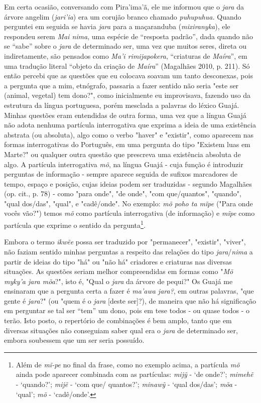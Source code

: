Em certa ocasião, conversando com Pira'ima'ã, ele me informou que o
\emph{jara} da árvore angelim (\emph{jari'ia}) era um corujão branco
chamado \emph{puhupuhua.} Quando perguntei em seguida se havia
\emph{jara} para a maçaranduba (\emph{mixiranyka}), ele respondeu serem
\emph{Mai nima}, uma espécie de ``resposta padrão'', dada quando não se
``sabe'' sobre o \emph{jara} de determinado ser, uma vez que muitos
seres, direta ou indiretamente, são pensados como \emph{Ma'i
rimijapokera}, ``criaturas de \emph{Maíra}'', em uma tradução literal
``objeto da criação de \emph{Maíra}'' (Magalhães 2010, p. 211). Só então
percebi que as questões que eu colocava soavam um tanto desconexas, pois
a pergunta que a mim, etnógrafo, passaria a fazer sentido não seria
"este ser (animal, vegetal) tem dono?", como inicialmente eu
improvisava, fazendo uso da estrutura da língua portuguesa, porém
mesclada a palavras do léxico Guajá. Minhas questões eram entendidas de
outra forma, uma vez que a língua Guajá não adota nenhuma partícula
interrogativa que exprima a ideia de uma existência abstrata (ou
absoluta), algo como o verbo "haver" e "existir", como aparecem nas
formas interrogativas do Português, em uma pergunta do tipo "Existem
luas em Marte?" ou qualquer outra questão que prescreva uma existência
absoluta de algo. A partícula interrogativa \emph{mõ}, na língua Guajá -
cuja função é introduzir perguntas de informação - sempre aparece
seguida de sufixos marcadores de tempo, espaço e posição, cujas ideias
podem ser traduzidas - segundo Magalhães (op. cit., p. 78) - como "para
onde", "de onde", "com que/quantos", "quando", "qual dos/das", "qual", e
"cadê/onde". No exemplo: \emph{mõ poho ta mĩpe} ("Para onde vocês vão?")
temos \emph{mõ} como partícula interrogativa (de informação) e
\emph{mĩpe} como partícula que exprime o sentido da pergunta\footnote{Além
  de \emph{mĩ-pe} no final da frase, como no exemplo acima, a partícula
  \emph{mõ} ainda pode aparecer combinada com as partículas: \emph{mijỹ}
  - `de onde?'; \emph{mimehẽ} - `quando?'; \emph{mijẽ} - `com que/
  quantos?'; \emph{minawỹ} - `qual dos/das'; \emph{mõa} - `qual';
  \emph{mõ} - `cadê/onde'.}.

Embora o termo \emph{ikwẽe} possa ser traduzido por "permanecer",
"existir", "viver", não faziam sentido minhas perguntas a respeito das
relações do tipo \emph{jara}/\emph{nima} a partir de ideias do tipo "há"
ou "não há" criadores e criaturas nas diversas situações. As questões
seriam melhor compreendidas em formas como "\emph{Mõ myky'a jara mõa}?",
isto é, "Qual o \emph{jara} da árvore de pequi?" Os Guajá me ensinaram
que a pergunta certa a fazer é \emph{ma'awa jara?}, em outras palavras,
"que gente é \emph{jara}?" (ou "quem é o \emph{jara} {[}deste ser{]}?),
de maneira que não há significação em perguntar se tal ser ``tem'' um
dono, pois em tese todos - ou quase todos - o terão. Isto posto, o
repertório de combinações é bem amplo, tanto que em diversas situações
não conseguiam saber qual era o \emph{jara} de determinado ser, embora
soubessem que um ser seria possuído.


